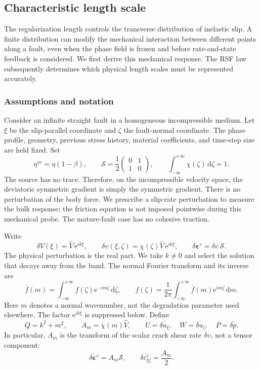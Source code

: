 \documentclass{article}
\begin{document}
\subsection{Characteristic length scale}
\label{sect:fourier_characteristic_length}

The regularization length controls the transverse distribution of inelastic
slip. A finite distribution can modify the mechanical interaction between
different points along a fault, even when the phase field is frozen and before
rate-and-state feedback is considered. We first derive this mechanical
response. The RSF law subsequently determines which physical length scales
must be represented accurately.

\subsubsection{Assumptions and notation}

Consider an infinite straight fault in a homogeneous incompressible medium.
Let $\xi$ be the slip-parallel coordinate and $\zeta$ the fault-normal
coordinate. The phase profile, geometry, previous stress history, material
coefficients, and time-step size are held fixed. Set
\[
  \eta^{ve} = \eta(1-\beta),\qquad
  \bm{\mathcal S} = \frac12\begin{pmatrix}0&1\\1&0\end{pmatrix},\qquad
  \int_{-\infty}^{+\infty}\chi(\zeta)\,\mathrm d\zeta=1.
\]
The source has no trace. Therefore, on the incompressible velocity space,
the deviatoric symmetric gradient is simply the symmetric gradient.
There is no perturbation of the body force. We prescribe a slip-rate
perturbation to measure the bulk response; the friction equation is not
imposed pointwise during this mechanical probe. The mature-fault case
has no cohesive traction.

Write
\[
  \delta V(\xi) = \widehat V\,\mathrm e^{ik\xi},\qquad
  \delta\upsilon(\xi,\zeta) = \chi(\zeta)\widehat V\,\mathrm e^{ik\xi},\qquad
  \delta\bm\varepsilon^c = \delta\upsilon\,\bm{\mathcal S}.
\]
The physical perturbation is the real part. We take $k\ne0$ and select
the solution that decays away from the band. The normal Fourier transform
and its inverse are
\[
  \overline f(m)=\int_{-\infty}^{+\infty}f(\zeta)\mathrm e^{-im\zeta}
          \,\mathrm d\zeta,\qquad
  f(\zeta)=\frac1{2\pi}\int_{-\infty}^{+\infty}\overline f(m)
          \mathrm e^{im\zeta}\,\mathrm dm.
\]
Here $m$ denotes a normal wavenumber, not the degradation parameter used
elsewhere. The factor $\mathrm e^{ik\xi}$ is suppressed below.
Define
\[
  Q=k^2+m^2,\qquad A_m=\overline\chi(m)\widehat V,\qquad
  U=\overline{\delta u_\xi},\quad
  W=\overline{\delta u_\zeta},\quad P=\overline{\delta p}.
\]
In particular, $A_m$ is the transform of the scalar crack shear rate
$\delta\upsilon$, not a tensor component:
\[
  \overline{\delta\bm\varepsilon^c}=A_m\bm{\mathcal S},
  \qquad
  \overline{\delta\varepsilon^c_{\xi\zeta}}=\frac{A_m}{2}.
\]
\end{document}
